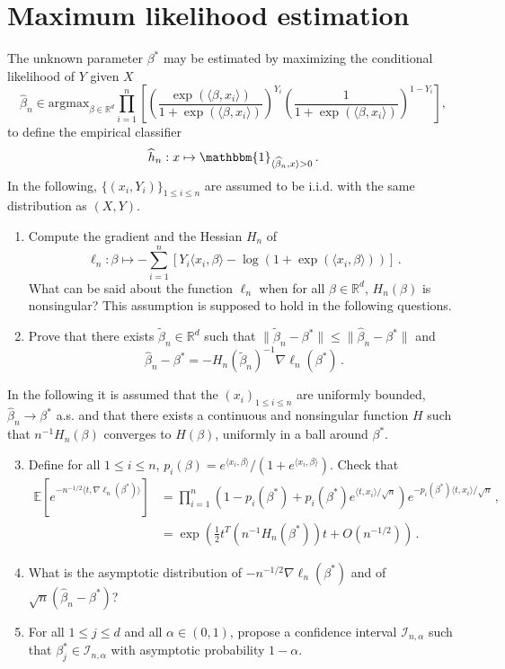 \documentclass[a4paper,10pt,fleqn]{article}
\newcommand{\eqsp}{\,}
\newcommand{\rset}{\ensuremath{\mathbb{R}}}
\newcommand{\1}{\ensuremath{\mathbbm{1}}}
\newcommand{\bE}{\mathbb{E}}
\begin{document}
\section*{Maximum likelihood estimation}
The unknown parameter $\beta^*$ may be estimated  by maximizing the conditional likelihood of $Y$ given $X$
$$
\widehat \beta_n\in\mathrm{argmax}_{\beta\in\mathbb{R}^{d}}
\prod_{i=1}^n \left[ \left( \frac{\exp\left(\langle
	\beta,x_{i}\rangle\right)}{1+\exp\left(\langle
	\beta,x_{i}\rangle\right)}\right)^{Y_{i}}
\left(\frac{1}{1+\exp\left(\langle
	\beta,x_{i}\rangle\right)}\right)^{1- Y_{i}} \right] ,
$$
to define the empirical classifier
$$
\widehat h_{n}: x \mapsto \1_{\langle \widehat\beta_n,x\rangle>0}\eqsp.
$$
In the following, $\{(x_i,Y_i)\}_{1\leqslant i\leqslant n}$ are assumed to be i.i.d. with the same distribution as $(X,Y)$.
\begin{enumerate}
\item Compute the gradient and the Hessian $H_{n}$ of
$$
\ell_{n}:\beta \mapsto -\sum_{i=1}^n\left[Y_{i}\langle x_{i},\beta\rangle-\log(1+\exp(\langle x_{i},\beta\rangle))\right]\eqsp.
$$
What can be said about the function $\ell_{n}$ when for all $\beta\in\rset^d$, $H_{n}(\beta)$ is nonsingular? This assumption is supposed to hold in the following questions.
\item Prove that there exists $\widetilde \beta_n\in\rset^d$ such that $\|\widetilde \beta_n-\beta^*\|\leq \|\widehat \beta_n-\beta^*\|$ and
$$
\widehat \beta_n-\beta^*=-H_{n}(\widetilde \beta_n)^{-1}\nabla \ell_{n}(\beta^*)\eqsp.
$$
\end{enumerate}
In the following it is assumed that the $(x_{i})_{1\leqslant i\leqslant n}$ are uniformly bounded, $\widehat \beta_n\to \beta^*$ a.s. and that there exists a continuous and nonsingular function $H$ such that $n^{-1}H_{n}(\beta)$ converges to $H(\beta)$, uniformly in a ball around $\beta^*$.
\begin{enumerate}  \setcounter{enumi}{2}
\item Define for all $1\leqslant i \leqslant n$, $p_{i}(\beta)=e^{\langle x_{i},\beta\rangle}/ \left(1+e^{\langle x_{i},\beta\rangle}\right)$. Check that
\begin{align*}
\bE \left[e^{-n^{-1/2}\langle t,\nabla\ell_{n}(\beta^*)\rangle}\right]& =\prod_{i=1}^n \left({1-p_{i}(\beta^*)+p_{i}(\beta^*)e^{\langle t,x_{i}\rangle/\sqrt{n}}}\right) e^{-p_{i}(\beta^*)\langle t,x_{i}\rangle/\sqrt{n}}\eqsp, \\
&=\exp\left(\frac{1}{2}t^T\left(n^{-1}H_{n}(\beta^*)\right)t+O(n^{-1/2})\right)\eqsp.
\end{align*}
\item What is the asymptotic distribution of $-n^{-1/2}\nabla\ell_{n}(\beta^*)$ and of $\sqrt{n}(\widehat \beta_n-\beta^*)$?
\item For all $1\leqslant j \leqslant d$ and all $\alpha\in(0,1)$, propose a confidence interval $\mathcal{I}_{n,\alpha}$ such that $\beta^*_{j}\in \mathcal{I}_{n,\alpha}$ with asymptotic probability $1-\alpha$.
\end{enumerate}
\end{document}
